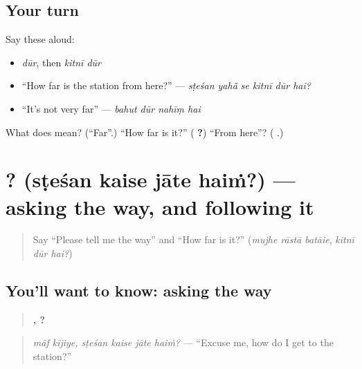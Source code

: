 \subsection*{Your turn}
Say these aloud:

\begin{itemize}
\raggedright
  \item \emph{dūr}, then \emph{kitnī dūr}
  \item \textquotedblleft{}How far is the station from here?\textquotedblright{} — \emph{sṭeśan yahā̃ se kitnī dūr hai?}
  \item \textquotedblleft{}It's not very far\textquotedblright{} — \emph{bahut dūr nahīṃ hai}
\end{itemize}

\begin{tcolorbox}[breakable,colback=teal!4,colframe=teal!35!black,title={Before you move on}]
What does \textbf{} mean? (\textquotedblleft{}Far\textquotedblright{}.) \textquotedblleft{}How far is it?\textquotedblright{} (\textbf{  ?}) \textquotedblleft{}From here\textquotedblright{}? (\textbf{ }.)
\end{tcolorbox}
\section[\texorpdfstring{\hi{स्टेशन} \hi{कैसे} \hi{जाते} \hi{हैं}? (sṭeśan kaise jāte haiṁ?)}{स्टेशन कैसे जाते हैं? (sṭeśan kaise jāte haiṁ?)}]{   ? (sṭeśan kaise jāte haiṁ?) — asking the way, and following it}

\label{lesson:HI-C282-kaisejatehain}



\begin{quote}
Say \textquotedblleft{}Please tell me the way\textquotedblright{} and \textquotedblleft{}How far is it?\textquotedblright{} (\emph{mujhe rāstā batāie}, \emph{kitnī dūr hai?})
\end{quote}

\subsection*{You'll want to know: asking the way}
\begin{quote}
\textbf{ ,    ?}
\end{quote}

\begin{quote}
\emph{māf kījiye, sṭeśan kaise jāte haiṁ?} — \textquotedblleft{}Excuse me, how do I get to the station?\textquotedblright{}
\end{quote}


